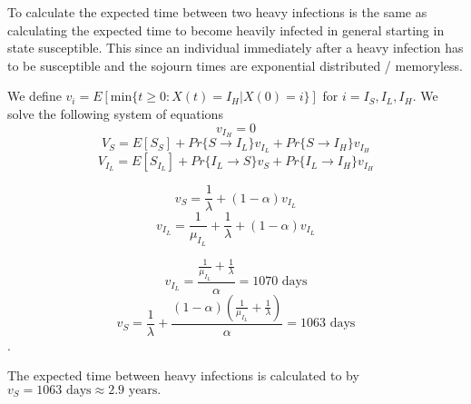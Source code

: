To calculate the expected time between two heavy infections is the same as calculating the expected time to become heavily infected in general starting in state susceptible. This since an individual immediately after a heavy infection  has to be susceptible and the sojourn times are exponential distributed / memoryless. 

We define $v_i = E[\text{min}\{t \geq 0: X(t) = I_H | X(0) = i\}]$ for $i = I_S, I_L, I_H$. We solve the following system of equations
$$v_{I_H} = 0$$
$$V_{S} = E[S_S] + Pr\{S \rightarrow I_L\} v_{I_L} + Pr\{S \rightarrow I_H\} v_{I_H} $$
$$V_{I_L} = E[S_{I_L}] + Pr\{I_L \rightarrow S\} v_S + Pr\{I_L \rightarrow I_H\} v_{I_H} $$


$$ v_{S} = \frac{1}{\lambda} + (1-\alpha) v_{I_L} $$
$$ v_{I_L} =  \frac{1}{\mu_{I_L}}+  \frac{1}{\lambda} + (1-\alpha) v_{I_L} $$

$$ v_{I_L} =  \frac{\frac{1}{\mu_{I_L}} +  \frac{1}{\lambda}}{\alpha} = 1070 \text{ days}$$
$$ v_S =  \frac{1}{\lambda} + \frac{ (1-\alpha)(\frac{1}{\mu_{I_L}} +  \frac{1}{\lambda})}{\alpha} = 1063 \text{ days} $$. 

The expected time between heavy infections is calculated to by $v_S = 1063 \text{ days} \approx 2.9 \text{ years.}$





